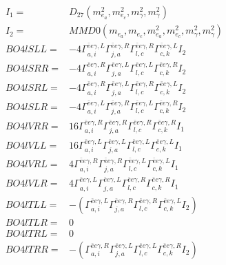 \documentclass[A4,landscape]{article}
\begin{document}
\begin{align} 
I_1 = & D_{27}(m^2_{e_{{a}}}, m^2_{e_{{c}}}, m^2_{\gamma}, m^2_{\gamma}) \\ 
I_2 = & MMD0(m_{e_{{a}}}, m_{e_{{c}}}, m^2_{e_{{a}}}, m^2_{e_{{c}}}, m^2_{\gamma}, m^2_{\gamma}) \\ 
  BO4lSLL= & -4  \Gamma^{\bar{e}e \gamma ,L}_{a, i} \Gamma^{\bar{e}e \gamma ,R}_{j, a} \Gamma^{\bar{e}e \gamma ,R}_{l, c} \Gamma^{\bar{e}e \gamma ,L}_{c, k} I_2 \\ 
  BO4lSRR= & -4  \Gamma^{\bar{e}e \gamma ,R}_{a, i} \Gamma^{\bar{e}e \gamma ,L}_{j, a} \Gamma^{\bar{e}e \gamma ,L}_{l, c} \Gamma^{\bar{e}e \gamma ,R}_{c, k} I_2 \\ 
  BO4lSRL= & -4  \Gamma^{\bar{e}e \gamma ,R}_{a, i} \Gamma^{\bar{e}e \gamma ,L}_{j, a} \Gamma^{\bar{e}e \gamma ,R}_{l, c} \Gamma^{\bar{e}e \gamma ,L}_{c, k} I_2 \\ 
  BO4lSLR= & -4  \Gamma^{\bar{e}e \gamma ,L}_{a, i} \Gamma^{\bar{e}e \gamma ,R}_{j, a} \Gamma^{\bar{e}e \gamma ,L}_{l, c} \Gamma^{\bar{e}e \gamma ,R}_{c, k} I_2 \\ 
  BO4lVRR= & 16  \Gamma^{\bar{e}e \gamma ,R}_{a, i} \Gamma^{\bar{e}e \gamma ,R}_{j, a} \Gamma^{\bar{e}e \gamma ,R}_{l, c} \Gamma^{\bar{e}e \gamma ,R}_{c, k} I_1 \\ 
  BO4lVLL= & 16  \Gamma^{\bar{e}e \gamma ,L}_{a, i} \Gamma^{\bar{e}e \gamma ,L}_{j, a} \Gamma^{\bar{e}e \gamma ,L}_{l, c} \Gamma^{\bar{e}e \gamma ,L}_{c, k} I_1 \\ 
  BO4lVRL= & 4  \Gamma^{\bar{e}e \gamma ,R}_{a, i} \Gamma^{\bar{e}e \gamma ,R}_{j, a} \Gamma^{\bar{e}e \gamma ,L}_{l, c} \Gamma^{\bar{e}e \gamma ,L}_{c, k} I_1 \\ 
  BO4lVLR= & 4  \Gamma^{\bar{e}e \gamma ,L}_{a, i} \Gamma^{\bar{e}e \gamma ,L}_{j, a} \Gamma^{\bar{e}e \gamma ,R}_{l, c} \Gamma^{\bar{e}e \gamma ,R}_{c, k} I_1 \\ 
  BO4lTLL= & -( \Gamma^{\bar{e}e \gamma ,L}_{a, i} \Gamma^{\bar{e}e \gamma ,R}_{j, a} \Gamma^{\bar{e}e \gamma ,R}_{l, c} \Gamma^{\bar{e}e \gamma ,L}_{c, k} I_2) \\ 
  BO4lTLR= & 0 \\ 
  BO4lTRL= & 0 \\ 
  BO4lTRR= & -( \Gamma^{\bar{e}e \gamma ,R}_{a, i} \Gamma^{\bar{e}e \gamma ,L}_{j, a} \Gamma^{\bar{e}e \gamma ,L}_{l, c} \Gamma^{\bar{e}e \gamma ,R}_{c, k} I_2) \\ 
\end{align} 
\end{document}
